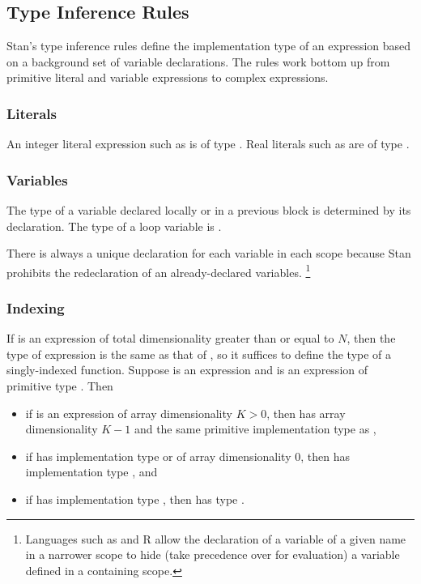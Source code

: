 \subsection{Type Inference Rules}

Stan's type inference rules define the implementation type of an
expression based on a background set of variable declarations.  The
rules work bottom up from primitive literal and variable expressions
to complex expressions.

\subsubsection{Literals}

An integer literal expression such as  is of type .
Real literals such as  are of type .

\subsubsection{Variables}

The type of a variable declared locally or in a previous block is
determined by its declaration.  The type of a loop variable is
.

There is always a unique declaration for each variable in each scope
because Stan prohibits the redeclaration of an already-declared
variables.%
%
\footnote{Languages such as \Cpp and R allow the declaration of a
  variable of a given name in a narrower scope to hide (take
  precedence over for evaluation) a variable defined in a containing
  scope.}

\subsubsection{Indexing}

If  is an expression of total dimensionality greater than or
equal to $N$, then the type of expression  is the
same as that of , so it suffices to define the type
of a singly-indexed function.  Suppose  is an expression and
 is an expression of primitive type .  Then
%
\begin{itemize}
\item if  is an expression of array dimensionality $K > 0$,
  then  has array dimensionality $K-1$ and the same
  primitive implementation type as ,
%
\item if  has implementation type  or
   of array dimensionality 0, then  has
  implementation type , and
%
\item if  has implementation type , then
   has type .
\end{itemize}

